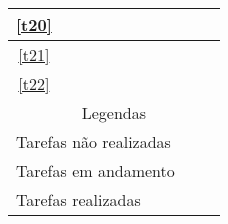 \begin{table}[!htbp]
\begin{tabular}{|c|c|c|c|c|c|c|c|c|c|c|}
      \hline
      \ref{t20}&&&&&&&&\cellcolor{red}&\cellcolor{red}&\\
      \hline
      \ref{t21}&&&&&&&&&\cellcolor{red}&\cellcolor{red}\\
      \hline
      \ref{t22}&&&&&&&&\cellcolor{red}&\cellcolor{red}&\cellcolor{red}\\
      \hline
      \multicolumn{11}{|c|}{Legendas}\\ \hline
      \multicolumn{10}{|l|}{Tarefas não realizadas} &\cellcolor{red}\\
      \hline
      \multicolumn{10}{|l|}{Tarefas em andamento} &\cellcolor{yellow}\\
      \hline
      \multicolumn{10}{|l|}{Tarefas realizadas}&\cellcolor{green}\\
      \hline
      \end{tabular}
  \end{table}
